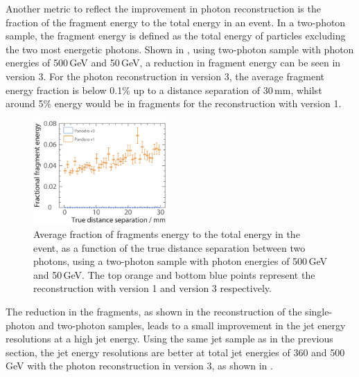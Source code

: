 Another metric to reflect the improvement in photon reconstruction is the fraction of the fragment energy to the total energy in an event. In a two-photon sample, the fragment energy is defined as the total energy of particles excluding the two most energetic photons. Shown in , using two-photon sample with photon energies of  500\,GeV and 50\,GeV, a reduction in fragment energy can be seen in \pandora version 3. For the photon reconstruction in \pandora version 3, the average fragment energy fraction is below 0.1\% up to a distance separation of  30\,mm, whilst around 5\% energy would be in fragments for the reconstruction with \pandora version 1.
\begin{figure}[tbph]
\centering
\includegraphics[width=0.45\textwidth]{photon/DoubleCompareFragEnergy4}
\caption[Average fraction fragments energy to the total energy, as a function of the MC distance separation]
{Average fraction of fragments energy to the total energy  in the event, as a function of the true distance separation between two photons, using a two-photon sample with photon energies of  500\,GeV and 50\,GeV. The top orange and bottom blue points represent the reconstruction with \pandora version 1 and version 3 respectively. }
\label{fig:photonDoubleFragEnergy}
\end{figure}



The reduction in the fragments, as shown in the reconstruction of the single-photon and two-photon samples, leads to a small improvement in the jet energy resolutions at a high jet energy. Using the same jet sample as in the previous section, the jet energy resolutions are better at total jet energies of 360 and 500\,GeV with the  photon reconstruction in \pandora version 3, as shown in .




